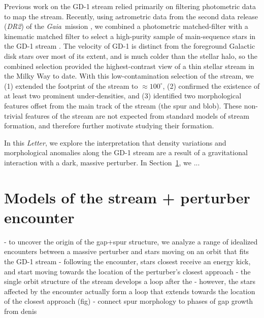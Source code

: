 \documentclass[12pt, modern]{aastex62}
\newcommand{\acronym}[1]{{\small{#1}}}
\newcommand{\gaia}{\textsl{Gaia}}
\newcommand{\articlename}{\textsl{Letter}}
\newcommand{\sectionname}{Section}
\newcommand{\DRtwo}{\textsl{\acronym{DR2}}}
\begin{document}
Previous work on the GD-1 stream relied primarily on filtering photometric data to map the stream.
Recently, using astrometric data from the second data release (\DRtwo) of the \gaia\ mission \citep{TODO}, we combined a photometric matched-filter with a kinematic matched filter to select a high-purity sample of main-sequence stars in the GD-1 stream \citep{Price-Whelan:2018}.
The velocity of GD-1 is distinct from the foreground Galactic disk stars over most of its extent, and is much colder than the stellar halo, so the combined selection provided the highest-contrast view of a thin stellar stream in the Milky Way to date.
With this low-contamination selection of the stream, we (1) extended the footprint of the stream to $\approx 100^\circ$, (2) confirmed the existence of at least two prominent under-densities, and (3) identified two morphological features offset from the main track of the stream (the spur and blob).
These non-trivial features of the stream are not expected from standard models of stream formation, and therefore further motivate studying their formation.

In this \articlename, we explore the interpretation that density variations and morphological anomalies along the GD-1 stream are a result of a gravitational interaction with a dark, massive perturber.
In \sectionname~\ref{sec:model}, we ...


\section{Models of the stream + perturber encounter}
\label{sec:model}
- to uncover the origin of the gap+spur structure, we analyze a range of idealized encounters between a massive perturber and stars moving on an orbit that fits the GD-1 stream
- following the encounter, stars closest receive an energy kick, and start moving towards the location of the perturber's closest approach
- the single orbit structure of the stream develops a loop after the
- however, the stars affected by the encounter actually form a loop that extends towards the location of the closest approach (fig)
- connect spur morphology to phases of gap growth from denis
\end{document}
